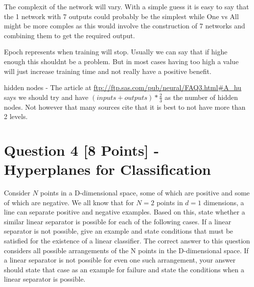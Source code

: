 \documentclass[fontsize=10pt,DIV=14]{scrartcl}
\begin{document}
\begin{enumerate}
		The complexit of the network will vary. With a simple guess it is easy to say that the 1 network with 7 outputs could probably be the simplest while One vs All might be more comples as this would involve the construction of 7 networks and combining them to get the required output.

		Epoch represents when training will stop. Usually we can say that if highe enough this shouldnt be a problem. But in most cases having too high a value will just increase training time and not really have a positive benefit.

		hidden nodes - The article at \url{ftp://ftp.sas.com/pub/neural/FAQ3.html#A_hu} says we should try and have $( inputs + outputs) * \frac{2}{3}$ as the number of hidden nodes. Not however that many sources cite that it is best to not have more than 2 levels.

	\end{enumerate}

	\section{Question 4 [8 Points] - Hyperplanes for Classification}

	Consider $N$ points in a D-dimensional space, some of which are positive and some of which are negative. We all know that for $N = 2$ points in $d = 1$ dimensions, a line can separate positive and negative examples. Based on this, state whether a similar linear separator is possible for each of the following cases. If a linear separator is not possible, give an example and state conditions that must be satisﬁed for the existence of a linear classiﬁer. The correct answer to this question considers all possible arrangements of the N points in the D-dimensional space. If a linear separator is not possible for even one such arrangement, your answer should state that case as an example for failure and state the conditions when a linear separator is possible. \\
\end{document}
